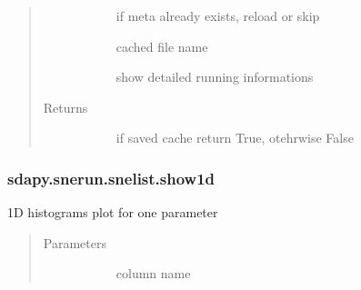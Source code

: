 \documentclass[letterpaper,10pt,english]{sphinxmanual}
\begin{document}
\begin{fulllineitems}
\begin{fulllineitems}
\begin{quote}
\begin{description}
\begin{description}
\item[{}] \leavevmode{[}\sphinxtitleref{bool}{]}
if meta already exists, reload or skip

\item[{}] \leavevmode{[}\sphinxtitleref{str}{]}
cached file name

\item[{}] \leavevmode{[}\sphinxtitleref{bool}{]}
show detailed running informations

\end{description}

\item[{Returns}] \leavevmode\begin{description}
\item[{}] \leavevmode{[}\sphinxtitleref{bool}{]}
if saved cache return True, otehrwise False

\end{description}

\end{description}\end{quote}



\begin{description}
\item[{{\hyperref[\detokenize{generated/sdapy.snerun.snelist.load_data:sdapy.snerun.snelist.load_data}]{}}}] \leavevmode
\end{description}



\end{fulllineitems}



\subsubsection{sdapy.snerun.snelist.show1d}
\label{\detokenize{generated/sdapy.snerun.snelist.show1d:sdapy-snerun-snelist-show1d}}\label{\detokenize{generated/sdapy.snerun.snelist.show1d::doc}}

\begin{fulllineitems}
\label{\detokenize{generated/sdapy.snerun.snelist.show1d:sdapy.snerun.snelist.show1d}}
1D histograms plot for one parameter
\begin{quote}\begin{description}
\item[{Parameters}] \leavevmode\begin{description}
\item[{}] \leavevmode{[}\sphinxtitleref{str}{]}
column name


\end{description}
\end{description}
\end{quote}
\end{fulllineitems}
\end{fulllineitems}
\end{document}
